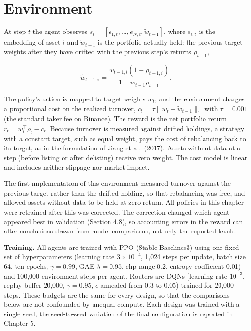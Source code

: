 \documentclass[12pt,a4paper]{report}
\begin{document}
\section{Environment}\label{environment}

At step \(t\) the agent observes
\(s_t = [e_{1,t},\dots,e_{N,t},\tilde w_{t-1}]\), where \(e_{i,t}\) is
the embedding of asset \(i\) and \(\tilde w_{t-1}\) is the portfolio
actually held: the previous target weights after they have drifted with
the previous step's returns \(\rho_{t-1}\),

\[\tilde w_{t-1,i} = \frac{w_{t-1,i}(1+\rho_{t-1,i})}{1 + w_{t-1}^\top \rho_{t-1}}.\]

The policy's action is mapped to target weights \(w_t\), and the
environment charges a proportional cost on the realized turnover,
\(c_t = \tau \lVert w_t - \tilde w_{t-1}\rVert_1\) with \(\tau = 0.001\)
(the standard taker fee on Binance). The reward is the net portfolio
return \(r_t = w_t^\top \rho_t - c_t\). Because turnover is measured
against drifted holdings, a strategy with a constant target, such as
equal weight, pays the cost of rebalancing back to its target, as in the
formulation of Jiang et al.~(2017). Assets without data at a step
(before listing or after delisting) receive zero weight. The cost model
is linear and includes neither slippage nor market impact.

The first implementation of this environment measured turnover against
the previous target rather than the drifted holding, so that rebalancing
was free, and allowed assets without data to be held at zero return. All
policies in this chapter were retrained after this was corrected. The
correction changed which agent appeared best in validation (Section
4.8), so accounting errors in the reward can alter conclusions drawn
from model comparisons, not only the reported levels.

\textbf{Training.} All agents are trained with PPO (Stable-Baselines3)
using one fixed set of hyperparameters (learning rate
\(3\times10^{-4}\), 1,024 steps per update, batch size 64, ten epochs,
\(\gamma=0.99\), GAE \(\lambda=0.95\), clip range 0.2, entropy
coefficient 0.01) and 100,000 environment steps per agent. Routers are
DQNs (learning rate \(10^{-3}\), replay buffer 20,000, \(\gamma=0.95\),
\(\epsilon\) annealed from 0.3 to 0.05) trained for 20,000 steps. These
budgets are the same for every design, so that the comparisons below are
not confounded by unequal compute. Each design was trained with a single
seed; the seed-to-seed variation of the final configuration is reported
in Chapter 5.
\end{document}

